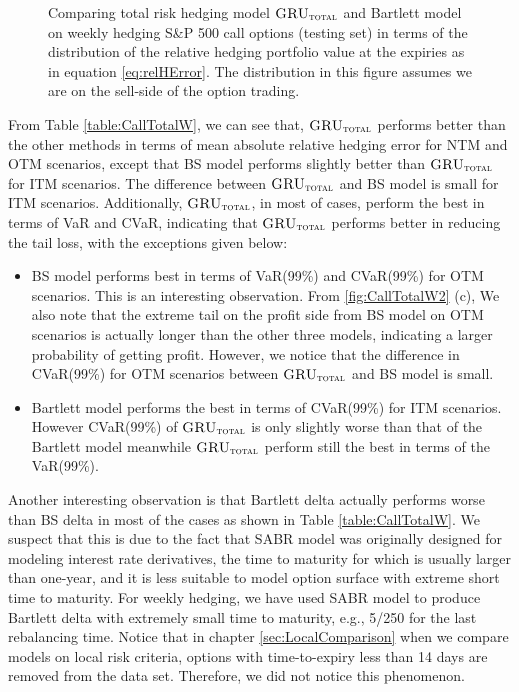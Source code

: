 \documentclass[letterpaper,12pt,titlepage,oneside,final]{book}
\numberwithin{equation}{section}
\theoremstyle{definition}
\newcommand{\modelT}{\textsc{GRU}_{\textsc{total}}}
\begin{document}
\begin{figure}[htp!]
	\caption{Comparing total risk hedging model $\modelT$ and Bartlett model on weekly hedging S\&P 500 call options (testing set) in terms of the distribution of the  relative hedging portfolio value at the expiries as in equation \eqref{eq:relHError}. The distribution in this figure assumes we are on the sell-side of the option trading.} \label{fig:CallTotalW3}
\end{figure}

From Table \ref{table:CallTotalW}, we can see that, $\modelT$ performs better than the other  methods in terms of 
mean absolute relative hedging error for NTM and OTM scenarios, except that BS model performs slightly better than   $\modelT$ for ITM scenarios. The difference between  $\modelT$  and BS model is small for ITM scenarios. Additionally, $\modelT$, in most of cases, perform the best in terms of VaR and CVaR, indicating that $\modelT$ performs better in reducing the tail loss, with the exceptions given below:
\begin{itemize}
	\item  BS model performs best in terms of  VaR(99\%) and  CVaR(99\%) for OTM scenarios. This is an interesting observation. From \ref{fig:CallTotalW2} (c), We also note that the extreme tail on the profit side from BS model on OTM scenarios is actually longer than the other three models, indicating a larger probability of getting  profit. However, we notice that the difference in  CVaR(99\%) for OTM scenarios between  $\modelT$ and BS model is small. 
	\item Bartlett model performs the best in terms of  CVaR(99\%) for ITM scenarios. However CVaR(99\%)  of $\modelT$ is only slightly worse than that of the Bartlett model meanwhile $\modelT$ perform still the best in terms of   the VaR(99\%).
\end{itemize}

Another interesting observation is that Bartlett delta actually performs worse than BS delta in most of the cases as shown in Table \ref{table:CallTotalW}. We suspect that this is due to the fact that SABR model was originally designed for modeling interest rate derivatives, the time to maturity for which is usually larger than one-year, and it is less suitable to model option surface with extreme short time to maturity\cite{chen2011calibration}. For weekly hedging, we have used SABR model to produce Bartlett delta with extremely small time to maturity, e.g., 5/250 for the last rebalancing time.
Notice that in chapter \ref{sec:LocalComparison} when we compare models on local risk criteria, options with time-to-expiry less than 14 days are removed from the data set. Therefore, we did not notice this phenomenon.
\end{document}
